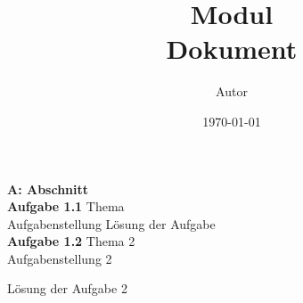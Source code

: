 \documentclass[11pt]{article}
\title {
	\textbf{Modul}\\
	[1ex] \large{
		\textbf{Dokument}
	}
}
\author{Autor}
\date{\today}
\newcommand{\task}[3]{\noindent\textsf{\textbf{Aufgabe #1}} \;\quad \textsf{#2}\\[4px] #3}
\begin{document}
	\addtocounter{page}{0}
	\maketitle

	\noindent\textsf{\textbf{A: Abschnitt}}\\[8px]
	\task{1.1}{Thema}{Aufgabenstellung}
	Lösung der Aufgabe
	\\[8px]
	\task{1.2}{Thema 2}{Aufgabenstellung 2}
	\par Lösung der Aufgabe 2
\end{document}
